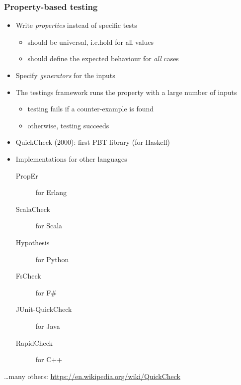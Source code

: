 \documentclass{beamer}
\begin{document}
\begin{frame}[allowframebreaks]
  \frametitle{Property-based testing}

\begin{itemize}
\item Write \emph{properties} instead of specific tests
\begin{itemize}
\item should be universal, i.e.\@ hold for all values
\item should define the expected behaviour for \emph{all} cases
\end{itemize}
\item Specify \emph{generators} for the inputs
\item The testings framework runs the property with
  a large number of inputs
  \begin{itemize}
  \item testing fails if a \alert{counter-example} is found
  \item otherwise, testing succeeds
  \end{itemize}
\end{itemize}

\framebreak

\begin{itemize}
\item QuickCheck (2000): first PBT library (for Haskell)
\item Implementations for other languages
  \begin{description}
  \item[PropEr] for Erlang
  \item[ScalaCheck] for Scala
  \item[Hypothesis] for Python
  \item[FsCheck] for F\#
  \item[JUnit-QuickCheck] for Java
  \item[RapidCheck] for C++
  \end{description}
\end{itemize}
\bigskip

\ldots many others: \url{https://en.wikipedia.org/wiki/QuickCheck}
\end{frame}
\end{document}

